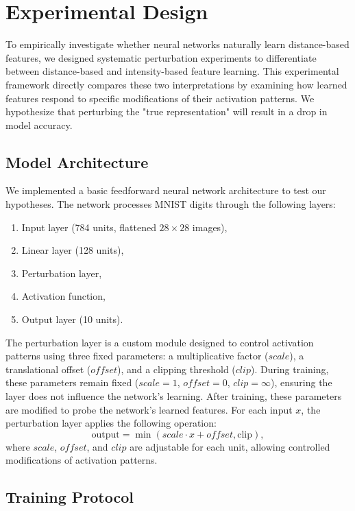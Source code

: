 \section{Experimental Design}

To empirically investigate whether neural networks naturally learn distance-based features, we designed systematic perturbation experiments to differentiate between distance-based and intensity-based feature learning. This experimental framework directly compares these two interpretations by examining how learned features respond to specific modifications of their activation patterns. We hypothesize that perturbing the "true representation" will result in a drop in model accuracy.

\subsection{Model Architecture}

We implemented a basic feedforward neural network architecture to test our hypotheses. The network processes MNIST digits through the following layers:
\begin{enumerate}
    \item Input layer (784 units, flattened $28 \times 28$ images),
    \item Linear layer (128 units),
    \item Perturbation layer,
    \item Activation function,
    \item Output layer (10 units).
\end{enumerate}

The perturbation layer is a custom module designed to control activation patterns using three fixed parameters: a multiplicative factor ($scale$), a translational offset ($offset$), and a clipping threshold ($clip$). During training, these parameters remain fixed ($scale = 1$, $offset = 0$, $clip = \infty$), ensuring the layer does not influence the network's learning. After training, these parameters are modified to probe the network's learned features. For each input $x$, the perturbation layer applies the following operation:
\begin{equation}
    \text{output} = \min(scale \cdot x + offset, \text{clip}),
\end{equation}
where $scale$, $offset$, and $clip$ are adjustable for each unit, allowing controlled modifications of activation patterns.

\subsection{Training Protocol}

